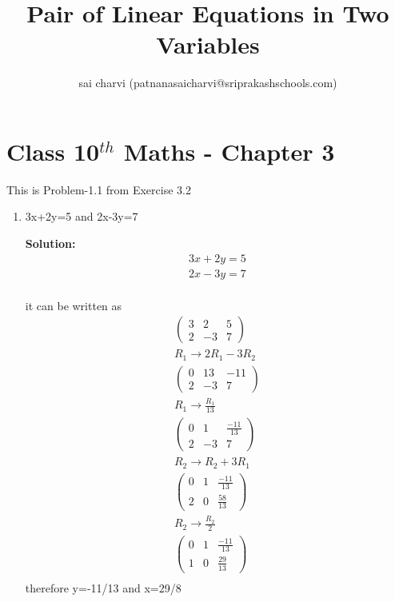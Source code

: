 \documentclass[10pt]{article}
\title{Pair of Linear Equations in Two Variables}
\author{sai charvi (patnanasaicharvi@sriprakashschools.com)}
\newcommand{\myvec}[1]{\ensuremath{\begin{pmatrix}#1\end{pmatrix}}}
\newcommand{\solution}{\noindent \textbf{Solution: }}
\begin{document}
\maketitle
\section*{Class 10$^{th}$ Maths - Chapter 3}
This is Problem-1.1 from Exercise 3.2
\begin{enumerate}
\item 3x+2y=5 and 2x-3y=7

\solution
\begin{align}
3x+2y=5\\
2x-3y=7\\
\end{align}

it can be written as\\
\begin{align}
\myvec{3&2&5\\2&-3&7}\\
R_1\xrightarrow\ 2R_1-3R_2\\
\myvec{0&13&-11\\2&-3&7}\\
R_1\xrightarrow\ \frac{R_1}{13}\\
\myvec{0&1&\frac{-11}{13}\\2&-3&7}\\
R_2\xrightarrow\ R_2+3R_1\\
\myvec{0&1&\frac{-11}{13}\\2&0&\frac{58}{13}}\\
R_2\xrightarrow\ \frac{R_2}{2}\\
\myvec{0&1&\frac{-11}{13}\\1&0&\frac{29}{13}}\\
\end{align}
therefore y=-11/13 and x=29/8
\end{enumerate}
\end{document}
